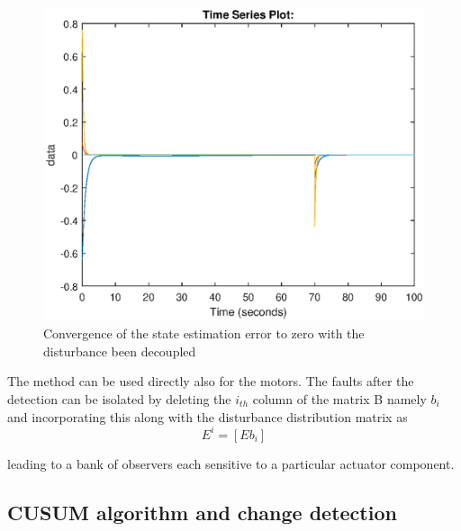 \begin{figure}[H]
	\centering
	\includegraphics[width=0.7\linewidth]{figures/obstest}
	\caption{Convergence of the state estimation error to zero with the disturbance been decoupled}
	\label{fig:residualobstest}
\end{figure}
The method can be used directly also for the motors. The faults after the detection can be isolated by deleting the $i_{th}$ column of the matrix B namely $b_{i}$ and incorporating this along with the disturbance distribution matrix as
\begin{equation}
	E^{i} = [ E  b_{i}]
	\label{errordynamics14}
\end{equation}


 leading to a bank of observers each sensitive to a particular actuator component.
\subsection{CUSUM algorithm and change detection} 